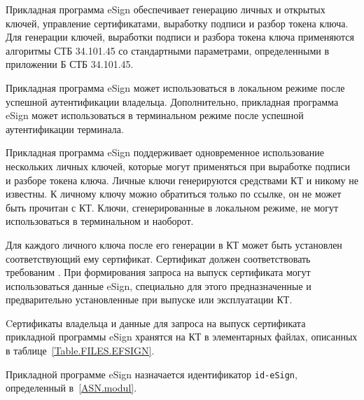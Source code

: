 Прикладная программа eSign обеспечивает генерацию личных и открытых 
ключей, управление сертификатами, выработку подписи и разбор токена ключа.
Для генерации ключей, выработки подписи и разбора токена ключа
применяются алгоритмы СТБ 34.101.45 со стандартными параметрами,
определенными в приложении Б СТБ 34.101.45.

Прикладная программа eSign может использоваться 
в локальном режиме после успешной аутентификации владельца.
Дополнительно, прикладная программа eSign может использоваться 
в терминальном режиме после успешной аутентификации терминала.

Прикладная программа eSign поддерживает одновременное 
использование нескольких личных ключей, 
которые могут применяться при выработке подписи и разборе токена ключа.
Личные ключи генерируются средствами КТ и никому не известны. 
К личному ключу можно обратиться только по ссылке, 
он не может быть прочитан с КТ. 
Ключи, сгенерированные в локальном режиме, не могут использоваться 
в терминальном и наоборот.

Для каждого личного ключа после его генерации в КТ может быть установлен 
соответствующий ему сертификат. Сертификат должен соответствовать
требованим .
При формирования запроса на выпуск сертификата могут использоваться
данные eSign, специально для этого предназначенные и предварительно
установленные при выпуске или эксплуатации КТ.

Cертификаты владельца и данные для запроса на выпуск сертификата
прикладной программы eSign хранятся на 
КТ в элементарных файлах, описанных в таблице~\ref{Table.FILES.EFSIGN}.

Прикладной программе eSign назначается идентификатор \verb|id-eSign|, 
определенный в~\ref{ASN.modul}. 

